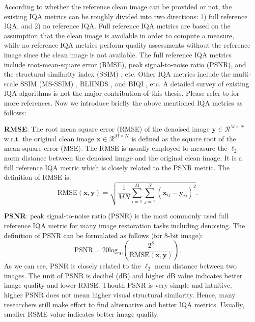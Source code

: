 According to whether the reference clean image can be provided or not, the existing IQA metrics can be roughly divided into two directions: 1) full reference IQA; and 2) no reference IQA. Full reference IQA metrics are based on the assumption that the clean image is available in order to compute a measure, while no reference IQA metrics perform quality assessments without the reference image since the clean image is not available. The full reference IQA metrics include root-mean-square error (RMSE), peak signal-to-noise ratio (PSNR), and the structural similarity index (SSIM) \cite{ssim}, etc. Other IQA metrics include the multi-scale SSIM (MS-SSIM) \cite{msssim}, BLIINDS \cite{bliinds}, and BIQI \cite{biqi}, etc. A detailed survey of existing IQA algorithms is not the major contribution of this thesis. Please refer to \cite{ssim} for more references. Now we introduce briefly the above mentioned IQA metrics as follows:

\textbf{RMSE}: The root mean square error (RMSE) of the denoised image $\bm{y}\in\mathcal{R}^{M\times N}$ w.r.t. the original clean image $\bm{x}\in\mathcal{R}^{M\times N}$ is defined as the square root of the mean square error (MSE). The RMSE is usually employed to measure the $\ell_{2}$-norm distance between the denoised image and the original clean image. It is a full reference IQA metric which is closely related to the PSNR metric. The definition of RMSE is:
\begin{equation}
\label{e13}
\text{RMSE}(\bm{x},\bm{y})
=
\sqrt{\frac{1}{MN}\sum_{i=1}^{M}\sum_{j=1}^{N}(\bm{x}_{ij}-\bm{y}_{ij})^{2}}.
\end{equation}



\textbf{PSNR}: peak signal-to-noise ratio (PSNR) is the most commonly used full reference IQA metric for many image restoration tasks including denoising. The definition of PSNR can be formulated as follows (for 8-bit image):
\begin{equation}
\label{e14}
\text{PSNR}
=
20\text{log}_{10}
(\frac{2^{8}}{\text{RMSE}(\bm{x},\bm{y})}).
\end{equation}
As we can see, PSNR is closely related to the $\ell_{2}$ norm distance between two images. The unit of PSNR is decibel (dB) and higher dB value indicates better image quality and lower RMSE. Thouth PSNR is very simple and intuitive, higher PSNR does not mean higher visual structural similarity. Hence, many researchers still make effort to find alternative and better IQA metrics. Usually, smaller RSME value indicates better image quality. 

